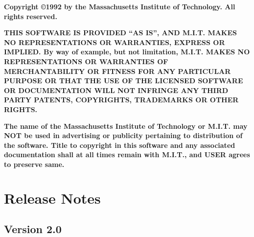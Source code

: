 {\bf
Copyright \copyright 1992 by the Massachusetts Institute of Technology.  
All rights reserved.  
}

{\bf
THIS SOFTWARE IS PROVIDED ``AS IS'', AND M.I.T. MAKES NO REPRESENTATIONS OR
WARRANTIES, EXPRESS OR IMPLIED.  By way of example, but not limitation,
M.I.T. MAKES NO REPRESENTATIONS OR WARRANTIES OF MERCHANTABILITY OR FITNESS
FOR ANY PARTICULAR PURPOSE OR THAT THE USE OF THE LICENSED SOFTWARE OR
DOCUMENTATION WILL NOT INFRINGE ANY THIRD PARTY PATENTS, COPYRIGHTS,
TRADEMARKS OR OTHER RIGHTS.   
}

{\bf
The name of the Massachusetts Institute of Technology or M.I.T. may NOT be
used in advertising or publicity pertaining to distribution of the
software.  Title to copyright in this software and any associated
documentation shall at all times remain with M.I.T., and USER agrees to
preserve same.  
}

\newpage
\tableofcontents
\newpage
{}
\setcounter{page}{1}
\newpage

\section{Release Notes}
\subsection{Version 2.0}
\label{ss:release20}

